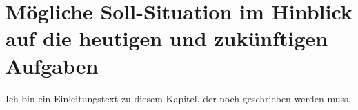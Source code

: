 \chapter{Mögliche Soll-Situation im Hinblick auf die heutigen und zukünftigen Aufgaben}

Ich bin ein Einleitungstext zu diesem Kapitel, der noch geschrieben werden muss.




